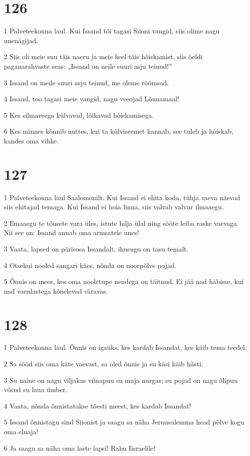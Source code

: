 \chapter{126}

\par 1 Palveteekonna laul. Kui Issand tõi tagasi Siioni vangid, siis olime nagu unenägijad.
\par 2 Siis oli meie suu täis naeru ja meie keel täis hõiskamist, siis öeldi paganarahvaste seas: „Issand on neile suuri asju teinud!”
\par 3 Issand on meile suuri asju teinud, me oleme rõõmsad.
\par 4 Issand, too tagasi meie vangid, nagu veeojad Lõunamaal!
\par 5 Kes silmaveega külvavad, lõikavad hõiskamisega.
\par 6 Kes minnes kõnnib nuttes, kui ta külviseemet kannab, see tuleb ja hõiskab, kandes oma vihke.

\chapter{127}

\par 1 Palveteekonna laul Saalomonilt. Kui Issand ei ehita koda, tühja vaeva näevad siis ehitajad temaga. Kui Issand ei hoia linna, siis valvab valvur ilmaaegu.
\par 2 Ilmaaegu te tõusete vara üles, istute hilja ülal ning sööte leiba raske vaevaga. Nii see on: Issand annab oma armsatele unes!
\par 3 Vaata, lapsed on pärisosa Issandalt, ihusugu on tasu temalt.
\par 4 Otsekui nooled sangari käes, nõnda on noorpõlve pojad.
\par 5 Õnnis on mees, kes oma nooletupe nendega on täitnud. Ei jää nad häbisse, kui nad vaenlastega kõnelevad väravas.

\chapter{128}

\par 1 Palveteekonna laul. Õnnis on igaüks, kes kardab Issandat, kes käib tema teedel.
\par 2 Sa sööd siis oma käte vaevast, sa oled õnnis ja su käsi käib hästi.
\par 3 Su naine on nagu viljakas viinapuu su maja nurgas; su pojad on nagu õlipuu võsud su laua ümber.
\par 4 Vaata, nõnda õnnistatakse tõesti meest, kes kardab Issandat!
\par 5 Issand õnnistagu sind Siionist ja saagu sa näha Jeruusalemma head põlve kogu oma eluaja!
\par 6 Ja saagu sa näha oma laste lapsi! Rahu Iisraelile!

